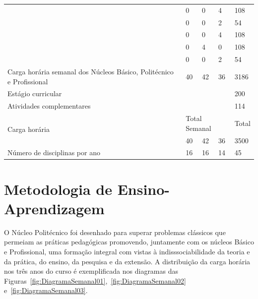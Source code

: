 \documentclass[11pt,fleqn]{book} %
\begin{document}
\begin{table}[H]
{\begin{tabular}{|l|l|l|l|l|l|}
			& \nameref{disc:microbiologia}                                                 & 0          & 0         & 4         & 108       \\ \cline{2-6}
			& \nameref{disc:fermentacao}                                                   & 0          & 0         & 2         & 54        \\ \cline{2-6} 			
			& \nameref{disc:producao}                                                      & 0          & 0         & 4         & 108       \\ \cline{2-6} 
			& \nameref{disc:analitica}                                                     & 0          & 4         & 0         & 108       \\ \cline{2-6} 
			& \nameref{disc:bioinfo}                                                       & 0          & 0         & 2         & 54       \\ \hline			
			\multicolumn{2}{|l|}{Carga horária semanal dos Núcleos Básico, Politécnico e Profissional} 
			                                                                               & 40         & 42        & 36        & 3186      \\ \hline
			\multicolumn{5}{|l|}{Estágio curricular}                                                                            & 200       \\ \hline
			\multicolumn{5}{|l|}{Atividades complementares}                                                                     & 114       \\ \hline
			\multicolumn{2}{|l|}{\multirow{2}{*}{Carga horária}}                           & \multicolumn{3}{l|}{Total Semanal} & Total     \\ \cline{3-6} 
			\multicolumn{2}{|l|}{}                                                         & 40         & 42        & 36        & 3500      \\ \hline
			\multicolumn{2}{|l|}{Número de disciplinas por ano}                            & 16         & 16        & 14        & 45        \\ \hline
		\end{tabular}%
	}
\end{table}

\section{Metodologia de Ensino-Aprendizagem}\label{metodologia}
\indent

O Núcleo Politécnico foi desenhado para superar problemas clássicos que permeiam as práticas pedagógicas promovendo, juntamente com os núcleos Básico e Profissional, uma formação integral com vistas à indisssociabilidade da teoria e da prática, do ensino, da pesquisa e da extensão. 
A distribuição da carga horária nos três anos do curso é exemplificada nos diagramas das Figuras~\ref{fig:DiagramaSemanal01},~\ref{fig:DiagramaSemanal02} e~\ref{fig:DiagramaSemanal03}.
\end{document}
